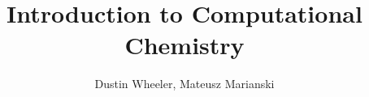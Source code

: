 \documentclass[nobib,nofonts,nols,nohyper]{tufte-handout}
\begin{document}
\title{Introduction to Computational Chemistry}

\author{Dustin Wheeler, Mateusz Marianski}
\end{document}
